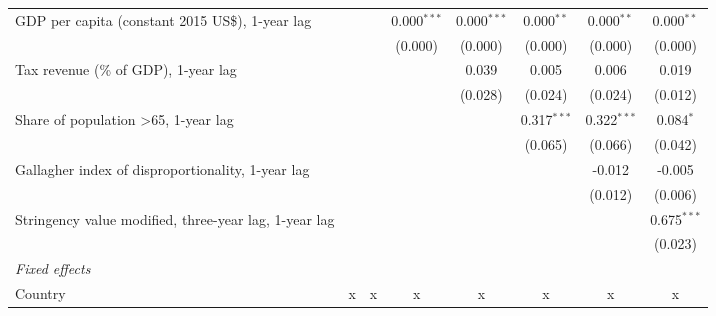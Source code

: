 \begin{tabular}{lccccccc}
   GDP per capita (constant 2015 US\$), 1-year lag                                            &              &              & 0.000$^{***}$ & 0.000$^{***}$ & 0.000$^{**}$   & 0.000$^{**}$   & 0.000$^{**}$\\   
                                                                                              &              &              & (0.000)       & (0.000)       & (0.000)        & (0.000)        & (0.000)\\   
   Tax revenue (\% of GDP), 1-year lag                                                        &              &              &               & 0.039         & 0.005          & 0.006          & 0.019\\   
                                                                                              &              &              &               & (0.028)       & (0.024)        & (0.024)        & (0.012)\\   
   Share of population >65, 1-year lag                                                        &              &              &               &               & 0.317$^{***}$  & 0.322$^{***}$  & 0.084$^{*}$\\   
                                                                                              &              &              &               &               & (0.065)        & (0.066)        & (0.042)\\   
   Gallagher index of disproportionality, 1-year lag                                          &              &              &               &               &                & -0.012         & -0.005\\   
                                                                                              &              &              &               &               &                & (0.012)        & (0.006)\\   
   Stringency value modified, three-year lag, 1-year lag                                      &              &              &               &               &                &                & 0.675$^{***}$\\   
                                                                                              &              &              &               &               &                &                & (0.023)\\   
   \emph{Fixed effects}\\
   Country                                                                                    & x            & x            & x             & x             & x              & x              & x\\  

\end{tabular}
